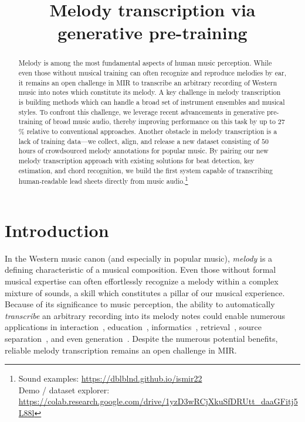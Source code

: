 \documentclass{article}
\title{
Melody transcription via generative pre-training
}
\begin{document}
\maketitle

\begin{abstract}
Melody is among the most fundamental aspects of human music perception. 
While even those without musical training can often recognize and reproduce melodies by ear, it remains an open challenge in MIR to transcribe an arbitrary recording of Western music into notes which constitute its melody. 
A key challenge in melody transcription is building methods which can handle a broad set of instrument ensembles and musical styles. 
To confront this challenge, we leverage recent advancements in generative pre-training of broad music audio, thereby improving performance on this task by up to $27$\% relative to conventional approaches. 
Another obstacle in melody transcription is a lack of training data---we collect, align, and release a new dataset consisting of $50$ hours of crowdsourced melody annotations for popular music. 
By pairing our new melody transcription approach with existing solutions for beat detection, key estimation, and chord recognition, 
we build the first system capable of transcribing human-readable lead sheets directly from music audio.\footnote{Sound examples: \url{https://dblblnd.github.io/ismir22} \\
Demo / dataset explorer: \url{https://colab.research.google.com/drive/1yzD3wRCjXkuSfDRUtt_daaGFitj5L88l}}
\end{abstract}


\section{Introduction}\label{sec:introduction}

In the Western music canon (and especially in popular music), 
\emph{melody} is a defining characteristic of a musical composition. 
Even those without formal musical expertise can often effortlessly recognize a melody within a complex mixture of sounds, a skill which constitutes a pillar of our musical experience. %
Because of its significance to music perception, 
the ability to automatically \emph{transcribe} an arbitrary recording into 
its melody notes 
could enable numerous applications in 
interaction~\cite{ryynanen2008accompaniment}, 
education~\cite{droe2006music}, 
informatics~\cite{bainbridge1999towards}, 
retrieval~\cite{ghias1995query}, 
source separation~\cite{ewert2014score},
and even generation~\cite{hawthorne2019enabling}.
Despite the numerous potential benefits, 
reliable melody transcription remains an open challenge in MIR.
\end{document}
